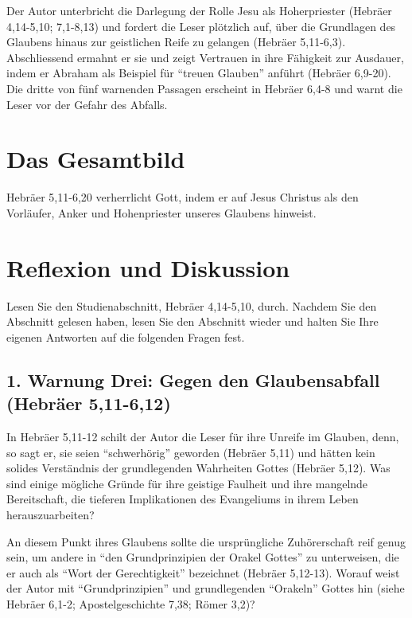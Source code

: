 \documentclass[
  12pt,
]{krantz}
\begin{document}
Der Autor unterbricht die Darlegung der Rolle Jesu als Hoherpriester (Hebräer 4,14-5,10; 7,1-8,13) und fordert die Leser plötzlich auf, über die Grundlagen des Glaubens hinaus zur geistlichen Reife zu gelangen (Hebräer 5,11-6,3). Abschliessend ermahnt er sie und zeigt Vertrauen in ihre Fähigkeit zur Ausdauer, indem er Abraham als Beispiel für ``treuen Glauben'' anführt (Hebräer 6,9-20). Die dritte von fünf warnenden Passagen erscheint in Hebräer 6,4-8 und warnt die Leser vor der Gefahr des Abfalls.

\hypertarget{das-gesamtbild}{%
\section{Das Gesamtbild}\label{das-gesamtbild}}

Hebräer 5,11-6,20 verherrlicht Gott, indem er auf Jesus Christus als den Vorläufer, Anker und Hohenpriester unseres Glaubens hinweist.

\hypertarget{reflexion-und-diskussion}{%
\section{Reflexion und Diskussion}\label{reflexion-und-diskussion}}

Lesen Sie den Studienabschnitt, Hebräer 4,14-5,10, durch. Nachdem Sie den Abschnitt gelesen haben, lesen Sie den Abschnitt wieder und halten Sie Ihre eigenen Antworten auf die folgenden Fragen fest.

\hypertarget{warnung-drei-gegen-den-glaubensabfall-hebruxe4er-511-612}{%
\subsection{1. Warnung Drei: Gegen den Glaubensabfall (Hebräer 5,11-6,12)}\label{warnung-drei-gegen-den-glaubensabfall-hebruxe4er-511-612}}

In Hebräer 5,11-12 schilt der Autor die Leser für ihre Unreife im Glauben, denn, so sagt er, sie seien ``schwerhörig'' geworden (Hebräer 5,11) und hätten kein solides Verständnis der grundlegenden Wahrheiten Gottes (Hebräer 5,12). Was sind einige mögliche Gründe für ihre geistige Faulheit und ihre mangelnde Bereitschaft, die tieferen Implikationen des Evangeliums in ihrem Leben herauszuarbeiten?

An diesem Punkt ihres Glaubens sollte die ursprüngliche Zuhörerschaft reif genug sein, um andere in ``den Grundprinzipien der Orakel Gottes'' zu unterweisen, die er auch als ``Wort der Gerechtigkeit'' bezeichnet (Hebräer 5,12-13). Worauf weist der Autor mit ``Grundprinzipien'' und grundlegenden ``Orakeln'' Gottes hin (siehe Hebräer 6,1-2; Apostelgeschichte 7,38; Römer 3,2)?
\end{document}
